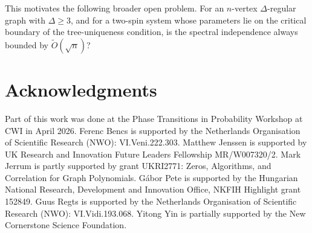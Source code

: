 \documentclass[11pt,a4paper]{article}
\theoremstyle{plain}
\begin{document}
This motivates the following broader open problem. For an $n$-vertex $\Delta$-regular graph with $\Delta\ge3$, and for a two-spin system whose parameters lie on the critical boundary of the tree-uniqueness condition, is the spectral independence always bounded by $\widetilde O(\sqrt n)$?



\section*{Acknowledgments}
Part of this work was done at the Phase Transitions in Probability Workshop at CWI in April 2026. Ferenc Bencs is supported by the Netherlands Organisation of Scientific Research (NWO): VI.Veni.222.303. Matthew Jenssen is supported by UK Research and Innovation Future Leaders Fellowship MR/W007320/2. Mark Jerrum is partly supported by grant UKRI2771: Zeros, Algorithms, and Correlation for Graph Polynomials. G\'abor Pete is supported by the Hungarian National Research, Development and Innovation Office, NKFIH Highlight grant 152849. Guus Regts is supported by the Netherlands Organisation of Scientific Research (NWO): VI.Vidi.193.068. Yitong Yin is partially supported by the New Cornerstone Science Foundation.





\end{document}

